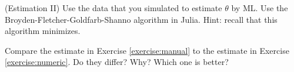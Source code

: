 \begin{exercise} (Estimation II) \label{exercise:numeric}
Use the data that you simulated to estimate $\theta$ by ML. Use the Broyden-Fletcher-Goldfarb-Shanno algorithm in Julia. Hint: recall that this algorithm minimizes.
\end{exercise}

\begin{exercise} 
Compare the estimate in Exercise \ref{exercise:manual} to the estimate in Exercise \ref{exercise:numeric}. Do they differ? Why? Which one is better?
\end{exercise}

 


